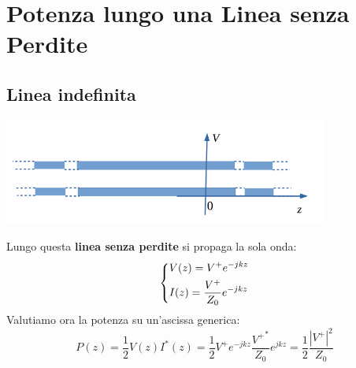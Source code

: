 \chapter{Potenza lungo una Linea senza Perdite}
\section{Linea indefinita}
\begin{center}
    \includegraphics[width=0.8\textwidth]{Images/Figure13.png}
\end{center}
Lungo questa \textbf{linea senza perdite} si propaga la sola onda:
\begin{equation*}
    \begin{dcases}
    V(z) = V^+ e^{-jkz}\\
    I(z) = \frac{V^+}{Z_0} e^{-jkz}
    \end{dcases}
\end{equation*}
Valutiamo ora la potenza su un'ascissa generica:
\begin{equation*}
    P(z) = \frac{1}{2} V(z) I^*(z) = \frac{1}{2} V^+ e^{-jkz} \frac{{V^+}^*}{Z_0}e^{jkz} =  \frac{1}{2} \frac{|V^+|^2}{Z_0}
\end{equation*}
